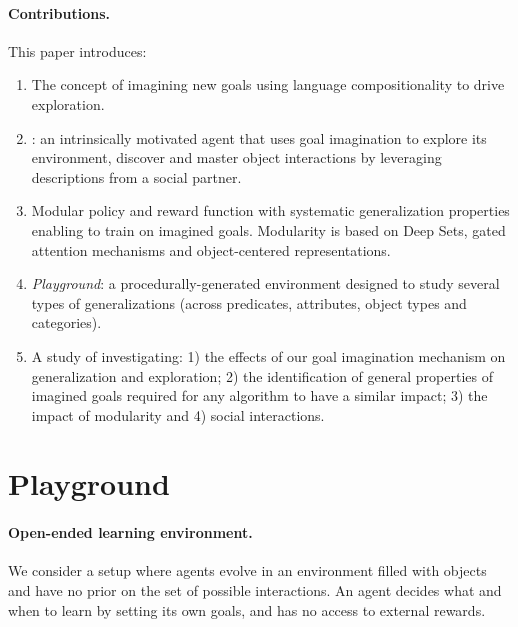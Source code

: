 \paragraph{Contributions.} This paper introduces:
\begin{enumerate}
    \item 
     The concept of imagining new goals using language compositionality to drive exploration.
    \item 
    \imagine: an intrinsically motivated agent that uses goal imagination to explore its environment, discover and master object interactions by leveraging \NL descriptions from a social partner.
    \item 
    Modular policy and reward function with systematic generalization properties enabling \imagine to train on imagined goals. Modularity is based on Deep Sets, gated attention mechanisms and object-centered representations.
    \item 
    \textit{Playground}: a procedurally-generated environment designed to study several types of generalizations (across predicates, attributes, object types and categories).
    \item 
    A study of \imagine investigating: 1) the effects of our goal imagination mechanism on generalization and exploration; 2) the identification of general properties of imagined goals required for any algorithm to have a similar impact; 3) the impact of modularity and 4) social interactions. 
    \end{enumerate}

\section{Playground}

\label{sec:pb_def}
\paragraph{Open-ended learning environment.} We consider a setup where agents evolve in an environment filled with objects and have no prior on the set of possible interactions. An agent decides what and when to learn by setting its own goals, and has no access to external rewards.


